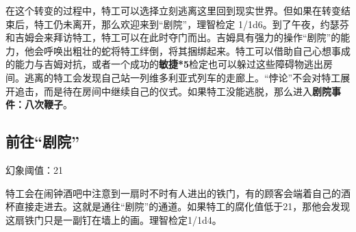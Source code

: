 在这个转变的过程中，特工可以选择立刻逃离这里回到现实世界。但如果在转变结束后，特工仍未离开，那么欢迎来到“剧院”，理智检定 1/1d6。到了午夜，约瑟芬和吉姆会来拜访特工，特工可以在此时夺门而出。吉姆具有强力的操作“剧院”的能力，他会呼唤出粗壮的蛇将特工绊倒，将其捆绑起来。特工可以借助自己心想事成的能力与吉姆对抗，或者一个成功的\textbf{敏捷*5}检定也可以躲过这些障碍物逃出房间。逃离的特工会发现自己站一列维多利亚式列车的走廊上。“悖论”不会对特工展开追击，而是待在房间中继续自己的仪式。如果特工没能逃脱，那么进入\textbf{剧院事件：八次鞭子}。

\subsection{前往“剧院”}
幻象阈值：21

特工会在闹钟酒吧中注意到一扇时不时有人进出的铁门，有的顾客会端着自己的酒杯直接走进去。这就是通往“剧院”的通道。如果特工的腐化值低于21，那他会发现这扇铁门只是一副钉在墙上的画。理智检定1/1d4。
